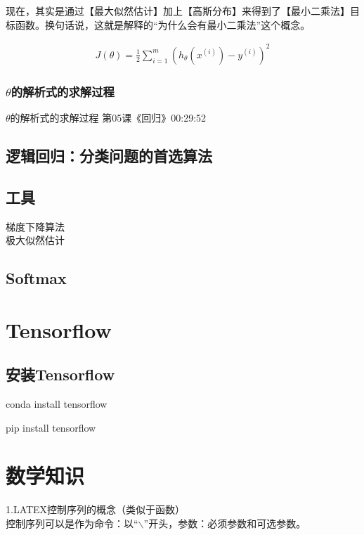 \documentclass[UTF8]{ctexart}
\begin{document}
现在，其实是通过【最大似然估计】加上【高斯分布】来得到了【最小二乘法】目标函数。换句话说，这就是解释的“为什么会有最小二乘法”这个概念。

\begin{equation}
\begin{aligned}
J(\theta)=\frac{1}{2} \sum_{i=1}^{m}(h_{\theta}(x^{(i)}) - y^{(i)})^{2}
\end{aligned}
\end{equation}

\subsubsection{$\theta$的解析式的求解过程}

$\theta$的解析式的求解过程 第05课《回归》00:29:52

\subsection{逻辑回归：分类问题的首选算法}
    
\subsection{工具}
梯度下降算法\\
极大似然估计\\
        
    \subsection{Softmax}
    \section{Tensorflow}
    \subsection{安装Tensorflow}

        conda install tensorflow

        pip install tensorflow

    \section{数学知识}
    1.LATEX控制序列的概念（类似于函数） \\ 控制序列可以是作为命令：以“$\backslash$”开头，参数：必须参数和可选参数。
\end{document}
